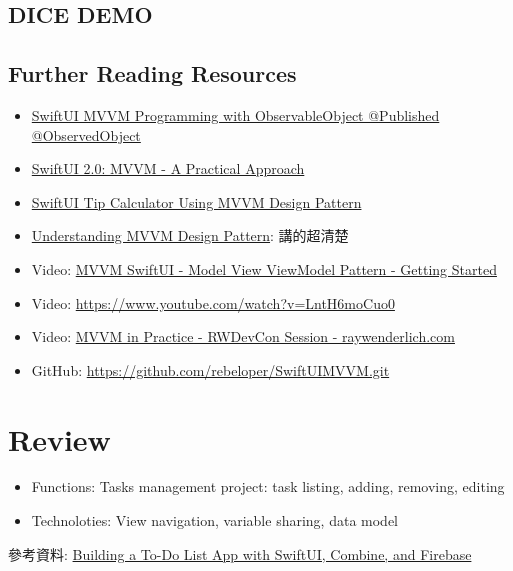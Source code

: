 \documentclass[a4paper,12pt]{article}
\begin{document}
\subsection{DICE DEMO}
\label{sec:orgabde78a}
\subsection{Further Reading Resources}
\label{sec:org61d1971}
\begin{itemize}
\item \href{https://www.youtube.com/watch?v=1IlUBHvgY8Q\&t=29s}{SwiftUI MVVM Programming with ObservableObject @Published @ObservedObject}\\
\item \href{https://www.youtube.com/watch?v=LntH6moCuo0}{SwiftUI 2.0: MVVM - A Practical Approach}\\
\item \href{https://www.youtube.com/watch?v=gkAV4D1nopA}{SwiftUI Tip Calculator Using MVVM Design Pattern}\\
\item \href{https://www.youtube.com/watch?v=cbqMkIG6Qeg}{Understanding MVVM Design Pattern}: 講的超清楚\\
\item Video: \href{https://www.youtube.com/watch?v=EhtK\_H9LsYQ}{MVVM SwiftUI - Model View ViewModel Pattern - Getting Started}\\
\item Video: \url{https://www.youtube.com/watch?v=LntH6moCuo0}\\
\item Video: \href{https://www.youtube.com/watch?v=sWx8TtRBOfk}{MVVM in Practice - RWDevCon Session - raywenderlich.com}\\
\item GitHub: \url{https://github.com/rebeloper/SwiftUIMVVM.git}\\
\end{itemize}
\newpage

\section{Review}
\label{SW-Review}
\begin{itemize}
\item Functions: Tasks management project: task listing, adding, removing, editing\\
\item Technoloties: View navigation, variable sharing, data model\\
\end{itemize}
參考資料: \href{https://medium.com/better-programming/replicating-the-ios-reminders-app-part1-44211a7b7029}{Building a To-Do List App with SwiftUI, Combine, and Firebase}\\
\end{document}
